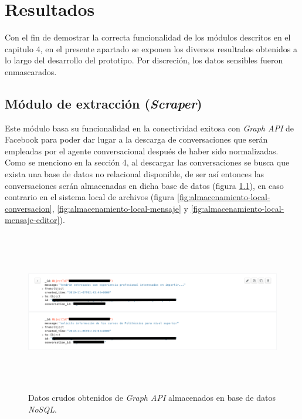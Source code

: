 \chapter{Resultados}
    Con el fin de demostrar la correcta funcionalidad de los módulos descritos en el capitulo 4, en el presente apartado se exponen los diversos resultados obtenidos a lo largo del desarrollo del prototipo. Por discreción, los datos sensibles fueron enmascarados.
    
    \section{Módulo de extracción (\textit{Scraper})}
    Este módulo basa su funcionalidad en la conectividad exitosa con \textit{Graph API} de Facebook para poder dar lugar a la descarga de conversaciones que serán empleadas por el agente conversacional después de haber sido normalizadas. Como se menciono en la sección 4, al descargar las conversaciones se busca que exista una base de datos no relacional disponible, de ser así entonces las conversaciones serán almacenadas en dicha base de datos (figura \ref{fig:almacenamiento-db-nosql}), en caso contrario en el sistema local de archivos (figura \ref{fig:almacenamiento-local-conversacion}, \ref{fig:almacenamiento-local-mensaje} y \ref{fig:almacenamiento-local-mensaje-editor}).
    
    \begin{figure}[H]
         \centering
         \includegraphics[height=7cm, width=16.5cm]{Latex/Classes/Imagenes/almacenamiento-db-nosql.png}
         \caption{Datos crudos obtenidos de \textit{Graph API} almacenados en base de datos \textit{NoSQL}.}
         \label{fig:almacenamiento-db-nosql}
    \end{figure}
    
